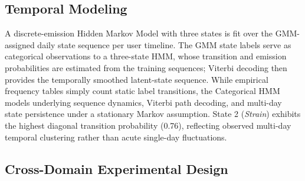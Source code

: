 \documentclass[conference]{IEEEtran}
\begin{document}
\subsection{Temporal Modeling}

A discrete-emission Hidden Markov Model with three states is fit over the GMM-assigned daily state sequence per user timeline. The GMM state labels serve as categorical observations to a three-state HMM, whose transition and emission probabilities are estimated from the training sequences; Viterbi decoding \cite{b14} then provides the temporally smoothed latent-state sequence. While empirical frequency tables simply count static label transitions, the Categorical HMM models underlying sequence dynamics, Viterbi path decoding, and multi-day state persistence under a stationary Markov assumption. State 2 (\textit{Strain}) exhibits the highest diagonal transition probability (0.76), reflecting observed multi-day temporal clustering rather than acute single-day fluctuations.

\subsection{Cross-Domain Experimental Design}
\end{document}
